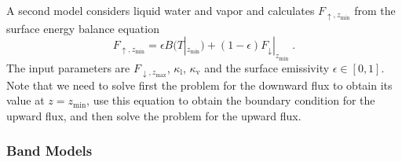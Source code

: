 A second model considers liquid water and vapor and calculates $F_{\uparrow,z_\mathrm{min}}$ from the surface energy balance equation
\begin{equation}
    F_{\uparrow,z_\mathrm{min}} = \epsilon B(T|_{z_\mathrm{min}})+(1-\epsilon)F_\downarrow|_{z_\mathrm{min}} \;.
\end{equation}
The input parameters are $F_{\downarrow,z_\mathrm{max}}$, $\kappa_\mathrm{l}$, $\kappa_\mathrm{v}$ and the surface emissivity $\epsilon\in[0,1]$. Note that we need to solve first the problem for the downward flux to obtain its value at $z=z_\mathrm{min}$, use this equation to obtain the boundary condition for the upward flux, and then solve the problem for the upward flux.

\subsubsection{Band Models}

